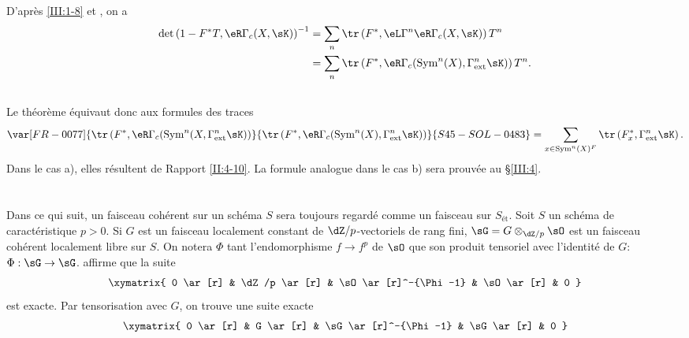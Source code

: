 D'après \ref{III:1-8} et , on a 
\begin{align*}
  \det\left(1-F^* T,\eR\Gamma_c(X,\sK)\right)^{-1} 
    &= \sum_n \tr\left(F^*,\eL\Gamma^n\eR\Gamma_c(X,\sK)\right) T^n \\
    &= \sum_n \tr\left(F^*,\eR\Gamma_c(\operatorname{Sym}^n(X),\Gamma_\text{ext}^n\sK)\right) T^n \text{.}
\end{align*}





\subsection{}\label{III:2-13}

Le théorème équivaut donc aux formules des traces 
\[
  \var[FR-0077]{\tr\left(F^*,\eR\Gamma_c(\operatorname{Sym}^n(X,\Gamma_\text{ext}^n \sK)\right)}{\tr\left(F^*,\eR\Gamma_c(\operatorname{Sym}^n(X),\Gamma_\text{ext}^n \sK)\right)}{S45-SOL-0483} = \sum_{x\in\operatorname{Sym}^n(X)^F} \tr\left(F_x^*,\Gamma_\text{ext}^n\sK\right) \text{.}
\]
Dans le cas a), elles résultent de Rapport \ref{II:4-10}. La formule 
analogue dans le cas b) sera prouvée au \S\ref{III:4}. 










\section{}\label{III:3}





\subsection{}\label{III:3-1}

Dans ce qui suit, un faisceau cohérent sur un schéma $S$ sera toujours 
regardé comme un faisceau sur $S_\text{ét}$. Soit $S$ un schéma de 
caractéristique $p>0$. Si $G$ est un faisceau localement constant de 
$\dZ/p$-vectoriels de rang fini, $\sG=G\otimes_{\dZ/p}\sO$ est un faisceau 
cohérent localement libre sur $S$. On notera $\Phi$ tant l'endomorphisme 
$f\to f^p$ de $\sO$ que son produit tensoriel avec l'identité de 
$G$: $\Phi:\sG\to\sG$.   
affirme que la suite 
\[\xymatrix{
  0 \ar[r] 
    & \dZ/p \ar[r] 
    & \sO \ar[r]^-{\Phi-1} 
    & \sO \ar[r] 
    & 0
}\]
est exacte. Par tensorisation avec $G$, on trouve une suite exacte 
\[\xymatrix{
  0 \ar[r] 
    & G \ar[r] 
    & \sG \ar[r]^-{\Phi-1} 
    & \sG \ar[r] 
    & 0
}\]





